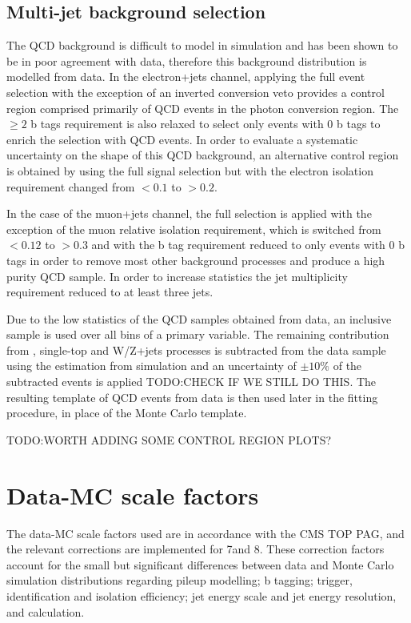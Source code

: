 \subsection{Multi-jet background selection}
\label{ss:background_selection}
The QCD background is difficult to model in simulation and has been shown to be in poor agreement with data,
therefore this background distribution is modelled from data. In the electron+jets channel, applying the full
event selection with the exception of an inverted conversion veto provides a control region comprised
primarily of QCD events in the photon conversion region. The $\geq 2$ b tags requirement is also
relaxed to select only events with 0 b tags to enrich the selection with QCD events.
In order to evaluate a systematic uncertainty on the shape of this QCD background, an alternative control region
is obtained by using the full signal selection but with the electron isolation requirement changed from $<
0.1$ to $> 0.2$.

In the case of the muon+jets channel, the full selection is applied with the exception of the muon relative
isolation requirement, which is switched from $< 0.12$ to $> 0.3$ and with the b tag requirement reduced to
only events with 0 b tags in order to remove most other \ttbar background processes and produce a high purity
QCD sample. In order to increase statistics the jet multiplicity requirement reduced to at least three jets.

Due to the low statistics of the QCD samples obtained from data, an inclusive sample is used over all bins of
a primary variable. The remaining contribution from \ttbar, single-top and W/Z+jets processes is subtracted
from the data sample using the estimation from simulation and an uncertainty of $\pm10\%$ of the subtracted
events is applied TODO:CHECK IF WE STILL DO THIS. %
The resulting template of QCD events from data is then used later in the fitting procedure, in place of the
Monte Carlo template.

TODO:WORTH ADDING SOME CONTROL REGION PLOTS?


\section{Data-MC scale factors}
\label{s:data_mc_scale_factors}
The data-MC scale factors used are in accordance with the CMS TOP PAG, and the relevant corrections are
implemented for 7\TeV and 8\TeV. These correction factors account for the small but significant differences
between data and Monte Carlo simulation distributions regarding pileup modelling; b tagging; trigger,
identification and isolation efficiency; jet energy scale and jet energy resolution, and \met calculation.

